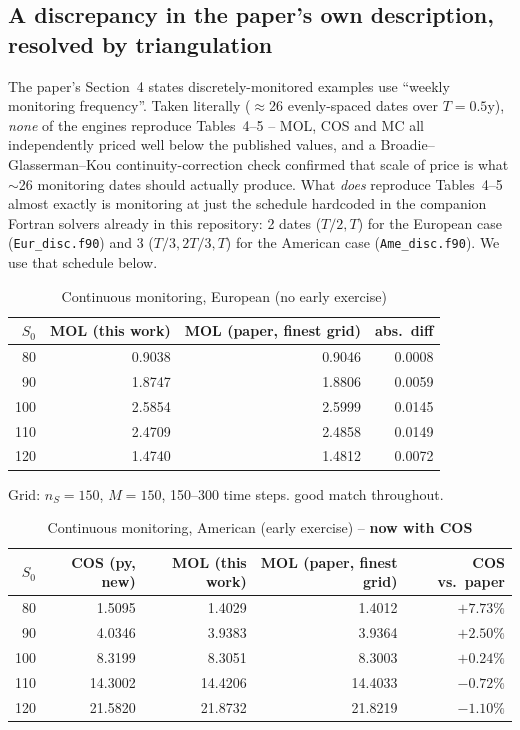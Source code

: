 \documentclass[11pt]{article}
\newcommand{\good}{\textcolor{green!45!black}{good}}
\begin{document}
\subsection*{A discrepancy in the paper's own description, resolved by triangulation}

The paper's Section~4 states discretely-monitored examples use ``weekly
monitoring frequency''. Taken literally ($\approx$26 evenly-spaced dates over
$T{=}0.5$y), \emph{none} of the engines reproduce Tables~4--5 -- MOL, COS and
MC all independently priced well below the published values, and a
Broadie--Glasserman--Kou continuity-correction check confirmed that scale of
price is what $\sim$26 monitoring dates should actually produce. What
\emph{does} reproduce Tables~4--5 almost exactly is monitoring at just the
schedule hardcoded in the companion Fortran solvers already in this
repository: 2 dates ($T/2, T$) for the European case (\texttt{Eur\_disc.f90})
and 3 ($T/3, 2T/3, T$) for the American case (\texttt{Ame\_disc.f90}). We use
that schedule below.

\begin{table}[h]
\centering
\caption{Continuous monitoring, European (no early exercise)}
\begin{tabular}{@{}rrrr@{}}
\toprule
$S_0$ & MOL (this work) & MOL (paper, finest grid) & abs.\ diff \\
\midrule
80  & 0.9038 & 0.9046 & 0.0008 \\
90  & 1.8747 & 1.8806 & 0.0059 \\
100 & 2.5854 & 2.5999 & 0.0145 \\
110 & 2.4709 & 2.4858 & 0.0149 \\
120 & 1.4740 & 1.4812 & 0.0072 \\
\bottomrule
\end{tabular}
\end{table}

Grid: $n_S{=}150$, $M{=}150$, 150--300 time steps. \good{} match throughout.

\begin{table}[h]
\centering
\caption{Continuous monitoring, American (early exercise) -- \textbf{now with COS}}
\begin{tabular}{@{}rrrrr@{}}
\toprule
$S_0$ & COS (py, new) & MOL (this work) & MOL (paper, finest grid) & COS vs.\ paper \\
\midrule
80  & 1.5095 & 1.4029 & 1.4012 & $+7.73\%$ \\
90  & 4.0346 & 3.9383 & 3.9364 & $+2.50\%$ \\
100 & 8.3199 & 8.3051 & 8.3003 & $+0.24\%$ \\
110 & 14.3002 & 14.4206 & 14.4033 & $-0.72\%$ \\
120 & 21.5820 & 21.8732 & 21.8219 & $-1.10\%$ \\
\bottomrule
\end{tabular}
\end{table}
\end{document}
